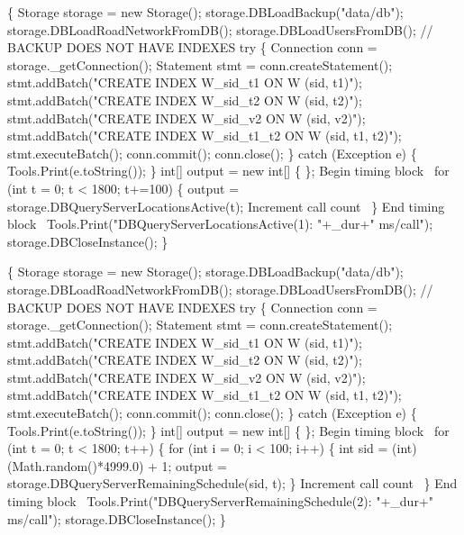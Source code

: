 \documentclass{article}
\def\nwendcode{\endtrivlist \endgroup}
\let\nwdocspar=\par
\begin{document}
\nwenddocs{}\endmoddef{}
\{
  Storage storage = new Storage();
  storage.DBLoadBackup("data/db");
  storage.DBLoadRoadNetworkFromDB();
  storage.DBLoadUsersFromDB();
  // BACKUP DOES NOT HAVE INDEXES
  try \{
    Connection conn = storage._getConnection();
    Statement stmt = conn.createStatement();
    stmt.addBatch("CREATE INDEX W_sid_t1 ON W (sid, t1)");
    stmt.addBatch("CREATE INDEX W_sid_t2 ON W (sid, t2)");
    stmt.addBatch("CREATE INDEX W_sid_v2 ON W (sid, v2)");
    stmt.addBatch("CREATE INDEX W_sid_t1_t2 ON W (sid, t1, t2)");
    stmt.executeBatch();
    conn.commit();
    conn.close();
  \} catch (Exception e) \{
    Tools.Print(e.toString());
  \}
  int[] output = new int[] \{ \};
  \LA{}Begin timing block~{\nwtagstyle{}}\RA{}
  for (int t = 0; t < 1800; t+=100) \{
    output = storage.DBQueryServerLocationsActive(t);
    \LA{}Increment call count~{\nwtagstyle{}}\RA{}
  \}
  \LA{}End timing block~{\nwtagstyle{}}\RA{}
  Tools.Print("DBQueryServerLocationsActive(1): "+_dur+" ms/call");
  storage.DBCloseInstance();
\}
\nwendcode{}\nwdocspar

\nwenddocs{}\endmoddef{}
\{
  Storage storage = new Storage();
  storage.DBLoadBackup("data/db");
  storage.DBLoadRoadNetworkFromDB();
  storage.DBLoadUsersFromDB();
  // BACKUP DOES NOT HAVE INDEXES
  try \{
    Connection conn = storage._getConnection();
    Statement stmt = conn.createStatement();
    stmt.addBatch("CREATE INDEX W_sid_t1 ON W (sid, t1)");
    stmt.addBatch("CREATE INDEX W_sid_t2 ON W (sid, t2)");
    stmt.addBatch("CREATE INDEX W_sid_v2 ON W (sid, v2)");
    stmt.addBatch("CREATE INDEX W_sid_t1_t2 ON W (sid, t1, t2)");
    stmt.executeBatch();
    conn.commit();
    conn.close();
  \} catch (Exception e) \{
    Tools.Print(e.toString());
  \}
  int[] output = new int[] \{ \};
  \LA{}Begin timing block~{\nwtagstyle{}}\RA{}
  for (int t = 0; t < 1800; t++) \{
    for (int i = 0; i < 100; i++) \{
      int sid = (int) (Math.random()*4999.0) + 1;
      output = storage.DBQueryServerRemainingSchedule(sid, t);
    \}
    \LA{}Increment call count~{\nwtagstyle{}}\RA{}
  \}
  \LA{}End timing block~{\nwtagstyle{}}\RA{}
  Tools.Print("DBQueryServerRemainingSchedule(2): "+_dur+" ms/call");
  storage.DBCloseInstance();
\}
\nwendcode{}
\end{document}
